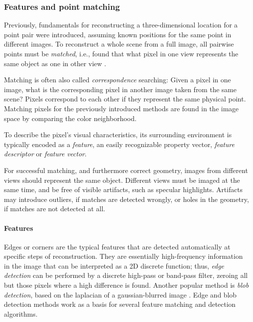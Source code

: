 

\subsubsection{Features and point matching} %


Previously, fundamentals for reconstructing a three-dimensional location for a point pair were introduced, assuming known positions for the same point in different images.
To reconstruct a whole scene from a full image, all pairwise points must be \emph{matched}, i.e., found that what pixel in one view represents the same object as one in other view \cite[ch. 4]{szeliski10vision}.

Matching is often also called \emph{correspondence} searching:
Given a pixel in one image, what is the corresponding pixel in another image taken from the same scene?
Pixels correspond to each other if they represent the same physical point.
Matching pixels for the previously introduced methods are found in the image space by comparing the color neighborhood.

To describe the pixel's visual characteristics, its surrounding environment is typically encoded as a \emph{feature}, an easily recognizable property vector, \emph{feature descriptor} or \emph{feature vector}.
\cite[ch. 4]{szeliski10vision}

For successful matching, and furthermore correct geometry, images from different views should represent the same object.
Different views must be imaged at the same time, and be free of visible artifacts, such as specular highlights.
Artifacts may introduce outliers, if matches are detected wrongly, or holes in the geometry, if matches are not detected at all.

\paragraph{Features}
Edges or corners are the typical features that are detected automatically at specific steps of reconstruction.
They are essentially high-frequency information in the image that can be interpreted as a 2D discrete function;
thus, \emph{edge detection} can be performed by a discrete high-pass or band-pass filter, zeroing all but those pixels where a high difference is found. \cite{marr1980theory}
Another popular method is \emph{blob detection}, based on the laplacian of a gaussian-blurred image \cite{?}.
Edge and blob detection methods work as a basis for several feature matching and detection algorithms. %

